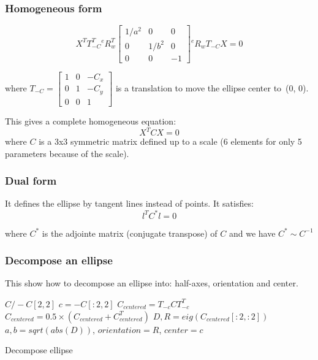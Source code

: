 \subsubsection{Homogeneous form}
\begin{equation}
    X^T T_{-C}^T
    {}^{e}R_{w}^T
    \left[ \begin{array}{ccc}
    1/a^2 & 0 & 0\\
    0 & 1/b^2 & 0\\
    0 & 0 & -1
    \end{array}\right]
    {}^{e}R_{w}
    T_{-C}
    X = 0
\end{equation}

where $T_{-C} = \left[\begin{array}{ccc}
    1&0&-C_x \\
    0&1&-C_y \\
    0&0&1
    \end{array}\right]$ is a translation to move the ellipse center to~(0, 0).

This gives a complete homogeneous equation:
\begin{equation}
    X^T C X = 0
\end{equation}
where $C$ is a 3x3 symmetric matrix defined up to a scale (6 elements for only 5 parameters because of the scale).

\subsubsection{Dual form}
It defines the ellipse by tangent lines instead of points. It satisfies:
\begin{equation}
    l^T C^* l = 0
\end{equation}

where $C^*$ is the adjointe matrix (conjugate transpose) of $C$ and we have $C^* \sim C^{-1}$

\subsubsection{Decompose an ellipse}
This show how to decompose an ellipse into: half-axes, orientation and center.
\begin{algorithm}[H]
\DontPrintSemicolon
{}
 $C/-C[2, 2]$ 
 $c = -C[:2, 2]$  
 $C_{centered} = T_{-c} C T_{-c}^T $ 
 $C_{centered} = 0.5\times(C_{centered}+C_{centered}^T)$ 
 $D, R = eig(C_{centered}[:2, :2])$ 
 $a, b = sqrt(abs(D))$, $orientation = R$, $center = c$
\caption{Decompose ellipse}
\end{algorithm}


